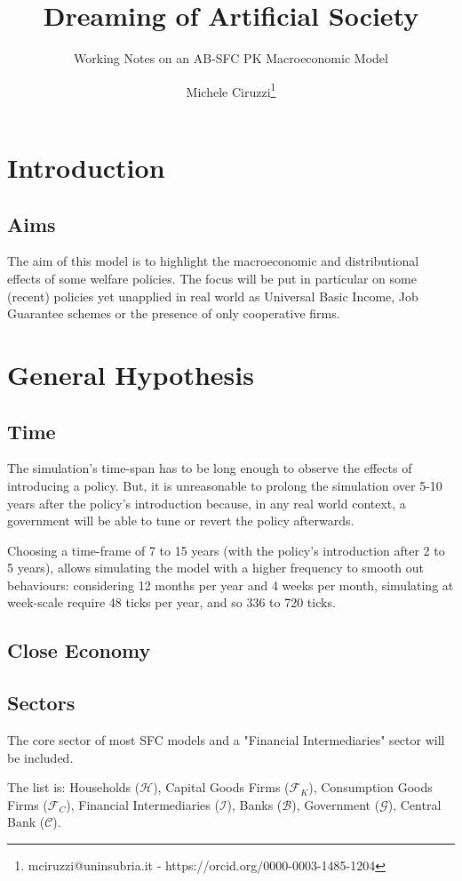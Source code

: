 \documentclass[a4paper, headings=standardclasses]{scrartcl}
\title{Dreaming of Artificial Society}
\subtitle{Working Notes on an AB-SFC PK Macroeconomic Model}
\author{Michele Ciruzzi\thanks{mciruzzi@uninsubria.it - https://orcid.org/0000-0003-1485-1204}}
\begin{document}
	
	\maketitle

	\tableofcontents

\section{Introduction}
\subsection{Aims}
The aim of this model is to highlight the macroeconomic and distributional effects of some welfare policies.  
The focus will be put in particular on some (recent) policies yet unapplied in real world as Universal Basic Income, Job Guarantee schemes or the presence of only cooperative firms.

\section{General Hypothesis}
\subsection{Time}
The simulation's time-span has to be long enough to observe the effects of introducing a policy. But, it is unreasonable to prolong the simulation over 5-10 years after the policy's introduction because, in any real world context, a government will be able to tune or revert the policy afterwards.

Choosing a time-frame of 7 to 15 years (with the policy's introduction after 2 to 5 years), allows simulating the model with a higher frequency to smooth out behaviours: considering 12 months per year and 4 weeks per month, simulating at week-scale require 48 ticks per year, and so 336 to 720 ticks.

\subsection{Close Economy}

\subsection{Sectors}
The core sector of most SFC models \parencite{nikiforos2017} and a "Financial Intermediaries" sector will be included.

The list is: Households ($\mathcal{H}$), Capital Goods Firms ($\mathcal{F}_K$), Consumption Goods Firms ($\mathcal{F}_C$), Financial Intermediaries ($\mathcal{I}$), Banks ($\mathcal{B}$), Government ($\mathcal{G}$), Central Bank ($\mathcal{C}$).
	
\end{document}
